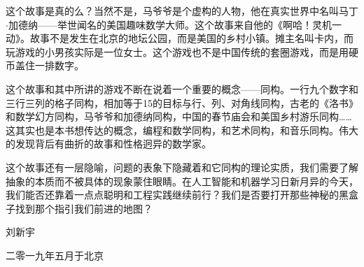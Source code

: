 \documentclass[UTF8]{article}
\begin{document}
这个故事是真的么？当然不是，马爷爷是个虚构的人物，他在真实世界中名叫马丁$\cdot$加德纳——举世闻名的美国趣味数学大师。这个故事来自他的《啊哈！灵机一动》。故事不是发生在北京的地坛公园，而是美国的乡村小镇。摊主名叫卡内，而玩游戏的小男孩实际是一位女士。这个游戏也不是中国传统的套圈游戏，而是用硬币盖住一排数字。

这个故事和其中所讲的游戏不断在说着一个重要的概念——同构。一行九个数字和三行三列的格子同构，相加等于15的目标与行、列、对角线同构，古老的《洛书》和数学幻方同构，马爷爷和加德纳同构，中国的春节庙会和美国乡村游乐同构……这其实也是本书想传达的概念，编程和数学同构，和艺术同构，和音乐同构。伟大的发现背后有曲折的故事和性格迥异的数学家。

这个故事还有一层隐喻，问题的表象下隐藏着和它同构的理论实质，我们需要了解抽象的本质而不被具体的现象蒙住眼睛。在人工智能和机器学习日新月异的今天，我们能否还靠着一点点聪明和工程实践继续前行？我们是否要打开那些神秘的黑盒子找到那个指引我们前进的地图？

\vspace{15mm}

刘新宇

二零一九年五月于北京

\begin{Exercise}
\end{Exercise}

\ifx\wholebook\relax \else

\expandafter\enddocument

\fi
\end{document}

